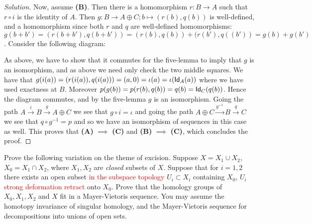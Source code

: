 \begin{proof}[Solution]
 Now, assume \textbf{(B)}. Then there is a homomorphism $r: B \to A$ such that $r\circ i$ is the identity of $A$. Then $g: B \to A\oplus C; b \mapsto (r(b), q(b))$ is well-defined, and a homomorphism since both $r$ and $q$ are well-defined homomorphisms: $g(b+b') = (r(b+b'), q(b+b')) = (r(b), q(b)) + (r(b'), q((b'))= g(b) + g(b')$. Consider the following diagram:
  \begin{center}
 \end{center}
As above, we have to show that it commutes for the five-lemma to imply that $g$ is an isomorphism, and as above we need only check the two middle squares. We have that $g(i(a)) = (r(i(a)), q(i(a))) = (a, 0) = \iota(a) = \iota(\mathsf{Id}_A(a))$ where we have used exactness at $B$. Moreover $p(g(b)) = p(r(b), q(b)) = q(b) = \mathsf{Id}_C(q(b))$. Hence the diagram commutes, and by the five-lemma $g$ is an isomorphism. Going the path $A \overset{i}{\to} B \overset{g}{\to} A\oplus C$ we see that $g \circ i = \iota$ and going the path $A\oplus C \overset{g^{-1}}{\to} B \overset{q}{\to} C$ we see that $q \circ g^{-1} = p$ and so we have an isomorphism of sequences in this case as well. This proves that \textbf{(A)} $\implies$ \textbf{(C)} and \textbf{(B)} $\implies$ \textbf{(C)}, which concludes the proof.
\end{proof}


\newpage


\begin{problem}
Prove the following variation on the theme of excision. Suppose $X = X_1 \cup X_2$, $X_0 = X_1 \cap X_2$, where $X_1, X_2$ are \textit{closed} subsets of $X$. Suppose that for $i = 1, 2$ there exists an open subset \textcolor{red}{in the subspace topology} $U_i \subset X_i$ containing $X_0$, $U_i$ \textcolor{red}{strong deformation retract} onto $X_0$. Prove that the homology groups of $X_0, X_1, X_2$ and $X$ fit in a Mayer-Vietoris sequence. You may assume the homotopy invariance of singular homology, and the Mayer-Vietoris sequence for decompositions into unions of open sets.
\end{problem}

